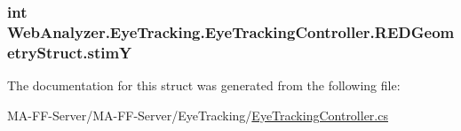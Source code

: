 \subsubsection[{stim\+Y}]{\setlength{\rightskip}{0pt plus 5cm}int Web\+Analyzer.\+Eye\+Tracking.\+Eye\+Tracking\+Controller.\+R\+E\+D\+Geometry\+Struct.\+stim\+Y}\label{struct_web_analyzer_1_1_eye_tracking_1_1_eye_tracking_controller_1_1_r_e_d_geometry_struct_a225b3c6bba3ca69b310869159ade4fbe}


The documentation for this struct was generated from the following file\+:\begin{DoxyCompactItemize}
\item 
M\+A-\/\+F\+F-\/\+Server/\+M\+A-\/\+F\+F-\/\+Server/\+Eye\+Tracking/\hyperlink{_eye_tracking_controller_8cs}{Eye\+Tracking\+Controller.\+cs}\end{DoxyCompactItemize}
